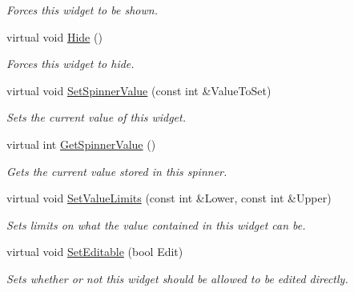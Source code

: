 \begin{DoxyCompactItemize}
\begin{DoxyCompactList}\small\item\em Forces this widget to be shown. \item\end{DoxyCompactList}\item 
\hypertarget{classphys_1_1UI_1_1Spinner_adcf8000c6d6eea51b52bac0d7f05bfd2}{
virtual void \hyperlink{classphys_1_1UI_1_1Spinner_adcf8000c6d6eea51b52bac0d7f05bfd2}{Hide} ()}
\label{d7/d81/classphys_1_1UI_1_1Spinner_adcf8000c6d6eea51b52bac0d7f05bfd2}

\begin{DoxyCompactList}\small\item\em Forces this widget to hide. \item\end{DoxyCompactList}\item 
virtual void \hyperlink{classphys_1_1UI_1_1Spinner_a7943087a7b61ec2ac7dcb7acab0e5345}{SetSpinnerValue} (const int \&ValueToSet)
\begin{DoxyCompactList}\small\item\em Sets the current value of this widget. \item\end{DoxyCompactList}\item 
virtual int \hyperlink{classphys_1_1UI_1_1Spinner_ae08a2762eb31aa28fcccf044973a2395}{GetSpinnerValue} ()
\begin{DoxyCompactList}\small\item\em Gets the current value stored in this spinner. \item\end{DoxyCompactList}\item 
virtual void \hyperlink{classphys_1_1UI_1_1Spinner_a933ec4a012ee5406b5ec576b0585a9c9}{SetValueLimits} (const int \&Lower, const int \&Upper)
\begin{DoxyCompactList}\small\item\em Sets limits on what the value contained in this widget can be. \item\end{DoxyCompactList}\item 
virtual void \hyperlink{classphys_1_1UI_1_1Spinner_abc02184e58175e363e2dfc1148ebd4d7}{SetEditable} (bool Edit)
\begin{DoxyCompactList}\small\item\em Sets whether or not this widget should be allowed to be edited directly. \item\end{DoxyCompactList}\item 

\end{DoxyCompactItemize}
